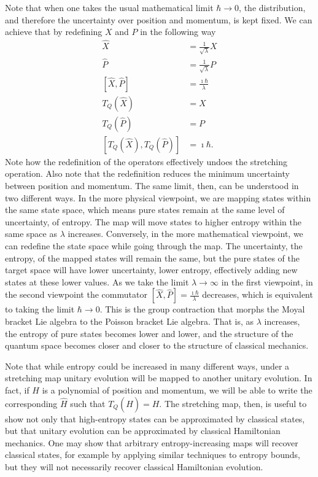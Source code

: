 \documentclass{article}
\begin{document}
Note that when one takes the usual mathematical limit $\hbar \to 0$, the distribution, and therefore the uncertainty over position and momentum, is kept fixed. We can achieve that by redefining $X$ and $P$ in the following way
\begin{align}
    \hat{X} &= \frac{1}{\sqrt{\lambda}} X \\
    \hat{P} &= \frac{1}{\sqrt{\lambda}} P \\
    [\hat{X}, \hat{P}] &= \frac{\imath \hbar}{\lambda} \\
    T_Q(\hat{X}) &=  X \\
    T_Q(\hat{P}) &=  P \\
    [T_Q(\hat{X}), T_Q(\hat{P})] &= \imath \hbar.
\end{align}
Note how the redefinition of the operators effectively undoes the stretching operation. Also note that the redefinition reduces the minimum uncertainty between position and momentum. The same limit, then, can be understood in two different ways. In the more physical viewpoint, we are mapping states within the same state space, which means pure states remain at the same level of uncertainty, of entropy. The map will move states to higher entropy within the same space as $\lambda$ increases. Conversely, in the more mathematical viewpoint, we can redefine the state space while going through the map. The uncertainty, the entropy, of the mapped states will remain the same, but the pure states of the target space will have lower  uncertainty, lower entropy, effectively adding new states at these lower values. As we take the limit $\lambda \to \infty$ in the first viewpoint, in the second viewpoint the commutator $[\hat{X},\hat{P}] = \frac{\imath \hbar}{\lambda}$ decreases, which is equivalent to taking the limit $\hbar \to 0$. This is the group contraction that morphs the Moyal bracket Lie algebra to the Poisson bracket Lie algebra.\cite{Moyal_1949,saletan1961contraction, inonu1953contraction} That is, as $\lambda$ increases, the entropy of pure states becomes lower and lower, and the structure of the quantum space becomes closer and closer to the structure of classical mechanics.

Note that while entropy could be increased in many different ways, under a stretching map unitary evolution will be mapped to another unitary evolution. In fact, if $H$ is a polynomial of position and momentum, we will be able to write the corresponding $\hat{H}$ such that $T_Q(\hat{H}) = H$. The stretching map, then, is useful to show not only that high-entropy states can be approximated by classical states, but that unitary evolution can be approximated by classical Hamiltonian mechanics. One may show that arbitrary entropy-increasing maps will recover classical states, for example by applying similar techniques to entropy bounds\cite{Hall_2018}, but they will not necessarily recover classical Hamiltonian evolution.
\end{document}

